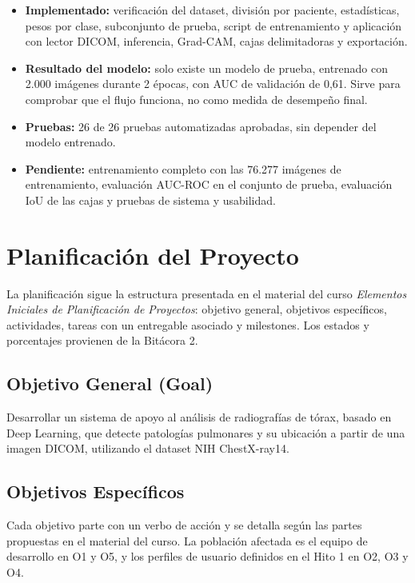\documentclass[11.5pt]{article}
\begin{document}
\begin{itemize}
    \item \textbf{Implementado:} verificación del dataset, división por paciente, estadísticas, pesos por clase, subconjunto de prueba, script de entrenamiento y aplicación con lector DICOM, inferencia, Grad-CAM, cajas delimitadoras y exportación.
    \item \textbf{Resultado del modelo:} solo existe un modelo de prueba, entrenado con 2.000 imágenes durante 2 épocas, con AUC de validación de 0,61. Sirve para comprobar que el flujo funciona, no como medida de desempeño final.
    \item \textbf{Pruebas:} 26 de 26 pruebas automatizadas aprobadas, sin depender del modelo entrenado.
    \item \textbf{Pendiente:} entrenamiento completo con las 76.277 imágenes de entrenamiento, evaluación AUC-ROC en el conjunto de prueba, evaluación IoU de las cajas y pruebas de sistema y usabilidad.
\end{itemize}

\section{Planificación del Proyecto}

La planificación sigue la estructura presentada en el material del curso \textit{Elementos Iniciales de Planificación de Proyectos}: objetivo general, objetivos específicos, actividades, tareas con un entregable asociado y milestones. Los estados y porcentajes provienen de la Bitácora 2.

\subsection{Objetivo General (Goal)}

Desarrollar un sistema de apoyo al análisis de radiografías de tórax, basado en Deep Learning, que detecte patologías pulmonares y su ubicación a partir de una imagen DICOM, utilizando el dataset NIH ChestX-ray14.

\subsection{Objetivos Específicos}

Cada objetivo parte con un verbo de acción y se detalla según las partes propuestas en el material del curso. La población afectada es el equipo de desarrollo en O1 y O5, y los perfiles de usuario definidos en el Hito 1 en O2, O3 y O4.
\end{document}

